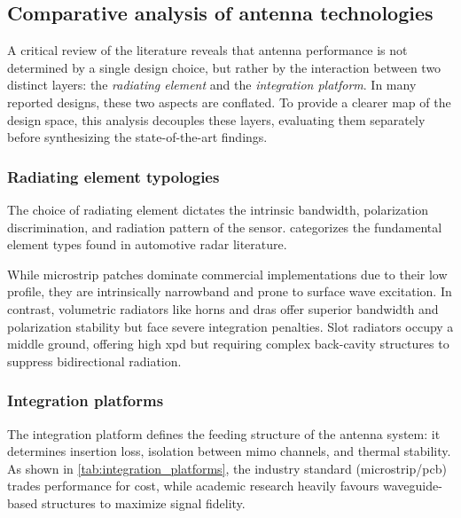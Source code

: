 \subsection{Comparative analysis of antenna technologies}

A critical review of the literature reveals that antenna performance is not determined by a single design choice, but rather by the interaction between two distinct layers: the \emph{radiating element} and the \emph{integration platform}.
In many reported designs, these two aspects are conflated.
To provide a clearer map of the design space, this analysis decouples these layers, evaluating them separately before synthesizing the state-of-the-art findings.


\subsubsection{Radiating element typologies}
The choice of radiating element dictates the intrinsic bandwidth, polarization discrimination, and radiation pattern of the sensor.
 categorizes the fundamental element types found in automotive radar literature.

While microstrip patches dominate commercial implementations due to their low profile, they are intrinsically narrowband and prone to surface wave excitation.
In contrast, volumetric radiators like horns and \glspl{dra} offer superior bandwidth and polarization stability but face severe integration penalties.
Slot radiators occupy a middle ground, offering high \gls{xpd} but requiring complex back-cavity structures to suppress bidirectional radiation.


\subsubsection{Integration platforms}
The integration platform defines the feeding structure of the antenna system: it determines insertion loss, isolation between \gls{mimo} channels, and thermal stability.
As shown in \cref{tab:integration_platforms}, the industry standard (microstrip/\gls{pcb}) trades performance for cost, while academic research heavily favours waveguide-based structures to maximize signal fidelity.

